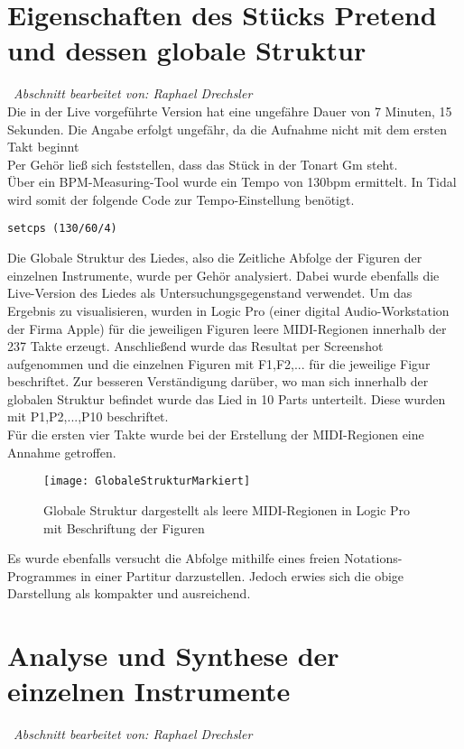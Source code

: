 \documentclass[
10pt, %
a4paper, %
oneside, %
headinclude,footinclude, %
BCOR5mm, %
]{scrartcl}
\begin{document}
\section{Eigenschaften des Stücks Pretend und dessen globale Struktur}\
\textit{Abschnitt bearbeitet von: Raphael Drechsler}\\

\noindent Die in der Live vorgeführte Version \cite{YT1} hat eine ungefähre Dauer von 7 Minuten, 15 Sekunden. Die Angabe erfolgt ungefähr, da die Aufnahme nicht mit dem ersten Takt beginnt\\
Per Gehör ließ sich feststellen, dass das Stück in der Tonart Gm steht.\\
Über ein BPM-Measuring-Tool \cite{tempo} wurde ein Tempo von 130bpm ermittelt. In Tidal wird somit der folgende Code zur Tempo-Einstellung benötigt. 
\begin{lstlisting}
setcps (130/60/4)
\end{lstlisting}

\noindent Die Globale Struktur des Liedes, also die Zeitliche Abfolge der Figuren der einzelnen Instrumente, wurde per Gehör analysiert. Dabei wurde ebenfalls die Live-Version des Liedes als Untersuchungsgegenstand verwendet. Um das Ergebnis zu visualisieren, wurden in Logic Pro\cite{Logic} (einer digital Audio-Workstation der Firma Apple) für die jeweiligen Figuren leere MIDI-Regionen innerhalb der 237 Takte erzeugt.
Anschließend wurde das Resultat per Screenshot aufgenommen und die einzelnen Figuren mit F1,F2,... für die jeweilige Figur beschriftet. Zur besseren Verständigung darüber, wo man sich innerhalb der globalen Struktur befindet wurde das Lied in 10 Parts unterteilt. Diese wurden mit P1,P2,...,P10 beschriftet.\\
Für die ersten vier Takte wurde bei der Erstellung der MIDI-Regionen eine Annahme getroffen.

\begin{figure}[h]
	\centering 
	\texttt{[image: GlobaleStrukturMarkiert]} 
	\caption{Globale Struktur dargestellt als leere MIDI-Regionen in Logic Pro mit Beschriftung der Figuren}
\end{figure}

\noindent Es wurde ebenfalls versucht die Abfolge mithilfe eines freien Notations-Programmes in einer Partitur darzustellen. Jedoch erwies sich die obige Darstellung als kompakter und ausreichend.

\section{Analyse und Synthese der einzelnen Instrumente}\
\textit{Abschnitt bearbeitet von: Raphael Drechsler}\\
\end{document}

